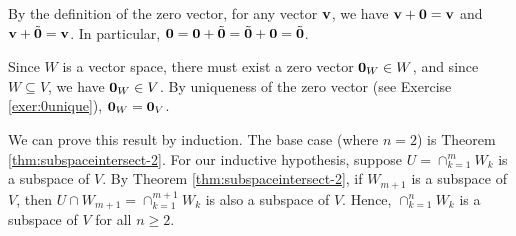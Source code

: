 \begin{sltn}[\ref{exer:0unique}]
By the definition of the zero vector, for any vector $ \mathbf{v} $, we have $ \mathbf{v}+\mathbf{0}=\mathbf{v} $ and $ \mathbf{v}+\tilde{\mathbf{0}}=\mathbf{v} $. In particular, $ \mathbf{0}=\mathbf{0}+\tilde{\mathbf{0}}=\tilde{\mathbf{0}}+\mathbf{0}=\tilde{\mathbf{0}} $.
\end{sltn}

\begin{sltn}
Since $ W $ is a vector space, there must exist a zero vector $ \mathbf{0}_W\in W $, and since $ W\subseteq V $, we have $ \mathbf{0}_W\in V $. By uniqueness of the zero vector (see Exercise \ref{exer:0unique}), $ \mathbf{0}_W=\mathbf{0}_V $.
\end{sltn}

\begin{sltn}
We can prove this result by induction. The base case (where $ n=2 $) is Theorem \ref{thm:subspaceintersect-2}. For our inductive hypothesis, suppose $ U=\cap_{k=1}^m W_k $ is a subspace of $ V $. By Theorem \ref{thm:subspaceintersect-2}, if $ W_{m+1} $ is a subspace of $ V $, then $ U\cap W_{m+1}=\cap_{k=1}^{m+1}W_k $ is also a subspace of $ V $. Hence, $ \cap_{k=1}^n W_k $ is a subspace of $ V $ for all $ n\geq 2 $.
\end{sltn}